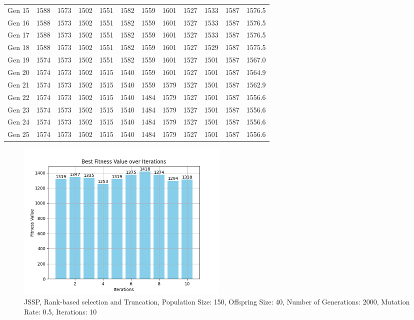 \documentclass[12pt]{article}
\begin{document}
\begin{table}[h]
\begin{adjustbox}{max width=0.5\textwidth}
\begin{tabular}{*{12}{c}}
            Gen 15 & 1588 & 1573 & 1502 & 1551 & 1582 & 1559 & 1601 & 1527 & 1533 & 1587 & 1576.5 \\
            Gen 16 & 1588 & 1573 & 1502 & 1551 & 1582 & 1559 & 1601 & 1527 & 1533 & 1587 & 1576.5 \\
            Gen 17 & 1588 & 1573 & 1502 & 1551 & 1582 & 1559 & 1601 & 1527 & 1533 & 1587 & 1576.5 \\
            Gen 18 & 1588 & 1573 & 1502 & 1551 & 1582 & 1559 & 1601 & 1527 & 1529 & 1587 & 1575.5 \\
            Gen 19 & 1574 & 1573 & 1502 & 1551 & 1582 & 1559 & 1601 & 1527 & 1501 & 1587 & 1567.0 \\
            Gen 20 & 1574 & 1573 & 1502 & 1515 & 1540 & 1559 & 1601 & 1527 & 1501 & 1587 & 1564.9 \\
            Gen 21 & 1574 & 1573 & 1502 & 1515 & 1540 & 1559 & 1579 & 1527 & 1501 & 1587 & 1562.9 \\
            Gen 22 & 1574 & 1573 & 1502 & 1515 & 1540 & 1484 & 1579 & 1527 & 1501 & 1587 & 1556.6 \\
            Gen 23 & 1574 & 1573 & 1502 & 1515 & 1540 & 1484 & 1579 & 1527 & 1501 & 1587 & 1556.6 \\
            Gen 24 & 1574 & 1573 & 1502 & 1515 & 1540 & 1484 & 1579 & 1527 & 1501 & 1587 & 1556.6 \\
            Gen 25 & 1574 & 1573 & 1502 & 1515 & 1540 & 1484 & 1579 & 1527 & 1501 & 1587 & 1556.6 \\
            \bottomrule
        \end{tabular}
    \end{adjustbox}
\end{table}


\begin{figure}[h]
    \centering
    \includegraphics[width=0.5\textwidth]{images/JSSP_rbstr150-40-2000-0.5-10.png}
    \caption{JSSP, Rank-based selection and Truncation, Population Size: 150, Offspring Size: 40, Number of Generations: 2000, Mutation Rate: 0.5, Iterations: 10}
\end{figure}
\end{document}
